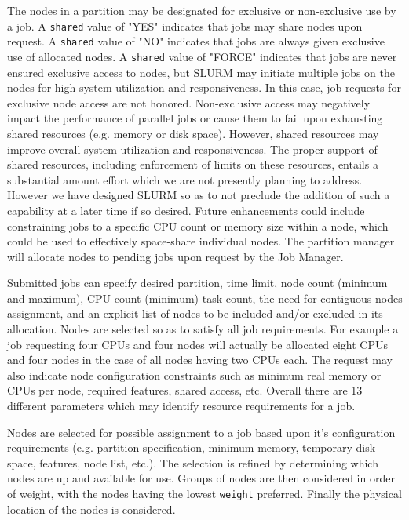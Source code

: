The nodes in a partition may be designated for exclusive or non-exclusive
use by a job.  A {\tt shared} value of "YES" indicates that jobs may share nodes
upon request.  A {\tt shared} value of "NO" indicates that jobs are always given
exclusive use of allocated nodes.  A {\tt shared} value of "FORCE" indicates
that jobs are never ensured exclusive access to nodes, but SLURM
may initiate multiple jobs on the nodes for high system utilization
and responsiveness.  In this case, job requests for exclusive node
access are not honored.  Non-exclusive access may negatively impact
the performance of parallel jobs or cause them to fail upon exhausting
shared resources (e.g. memory or disk space). However, shared resources
may improve overall system utilization and responsiveness. The
proper support of shared resources, including enforcement of limits on
these resources, entails a substantial amount effort which we are not
presently planning to address.  However we have designed SLURM so as
to not preclude the addition of such a capability at a later time if
so desired.  Future enhancements could include constraining jobs to a
specific CPU count or memory size within a node, which could be used
to effectively space-share individual nodes.  The partition manager will 
allocate nodes to pending jobs upon request by the Job Manager.

Submitted jobs can specify desired partition, time limit, 
node count (minimum and maximum), CPU count (minimum) task count,  
the need for contiguous nodes assignment, 
and an explicit list of nodes to be included and/or excluded in its 
allocation.  Nodes are selected so as to satisfy all
job requirements.  For example a job requesting four CPUs and four nodes
will actually be allocated eight CPUs and four nodes in the case of all
nodes having two CPUs each.  
The request may also indicate node configuration constraints such as
minimum real memory or CPUs per node, required features, shared access, etc.
Overall there are 13 different parameters which may identify resource 
requirements for a job.

Nodes are selected for possible assignment to a job based upon it's
configuration requirements (e.g. partition specification, minimum memory,
temporary disk space, features, node list, etc.).  The selection is
refined by determining which nodes are up and available for use.
Groups of nodes are then considered in order of weight, with the
nodes having the lowest {\tt weight} preferred.
Finally the physical location of the nodes is considered.

